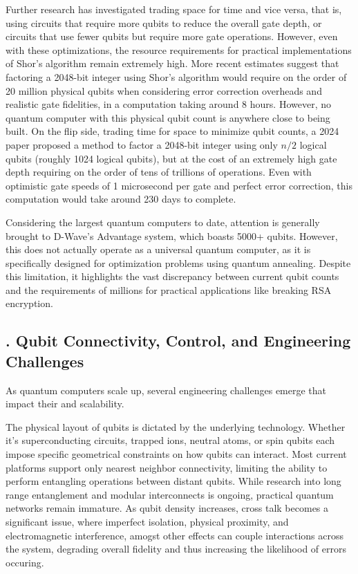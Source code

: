 \documentclass{elbioimp2}
\begin{document}
Further research has investigated trading space for time and vice versa, that is, using circuits that require more qubits to reduce the overall gate depth, or circuits that use fewer qubits but require more gate operations. However, even with these optimizations, the resource requirements for practical implementations of Shor's algorithm remain extremely high. More recent estimates suggest that factoring a 2048-bit integer using Shor's algorithm would require on the order of 20 million physical qubits when considering error correction overheads and realistic gate fidelities, in a computation taking around 8 hours\cite{Gidney_2021}. However, no quantum computer with this physical qubit count is anywhere close to being built. On the flip side, trading time for space to minimize qubit counts, a 2024 paper proposed a method to factor a 2048-bit integer using only $n/2$ logical qubits (roughly 1024 logical qubits), but at the cost of an extremely high gate depth requiring on the order of tens of trillions of operations\cite{10.1007/978-3-032-01878-6_13}. Even with optimistic gate speeds of 1 microsecond per gate and perfect error correction, this computation would take around 230 days to complete.

Considering the largest quantum computers to date, attention is generally brought to D-Wave's Advantage system, which boasts 5000+ qubits\cite{NatureQC2023}. However, this does not actually operate as a universal quantum computer, as it is specifically designed for optimization problems using quantum annealing. Despite this limitation, it highlights the vast discrepancy between current qubit counts and the requirements of millions for practical applications like breaking RSA encryption.


\subsection{. Qubit Connectivity, Control, and Engineering Challenges}

As quantum computers scale up, several engineering challenges emerge that impact their and scalability.

The physical layout of qubits is dictated by the underlying technology. Whether it's superconducting circuits, trapped ions, neutral atoms, or spin qubits each impose specific geometrical constraints on how qubits can interact. Most current platforms support only nearest neighbor connectivity, limiting the ability to perform entangling operations between distant qubits. While research into long range entanglement and modular interconnects is ongoing, practical quantum networks remain immature. As qubit density increases, cross talk becomes a significant issue, where imperfect isolation, physical proximity, and electromagnetic interference, amogst other effects can couple interactions across the system, degrading overall fidelity and thus increasing the likelihood of errors occuring.
\end{document}
